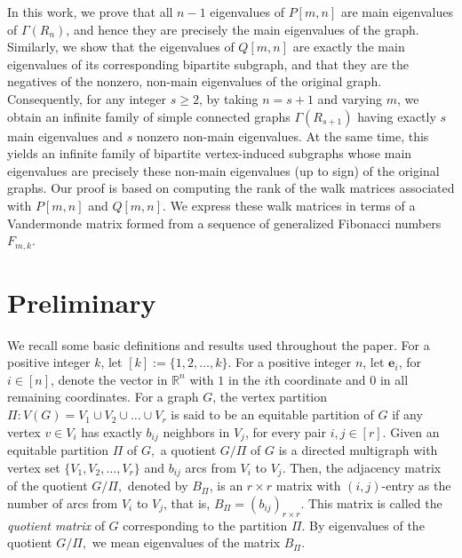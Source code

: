 \documentclass[11pt,oneside]{article}
\theoremstyle{plain}
\theoremstyle{plain}
\theoremstyle{definition}
\numberwithin{figure}{section}
\theoremstyle{remark}
\numberwithin{equation}{section}
\begin{document}
	In this work, we prove that all \(n-1\) eigenvalues of \(P[m,n]\) are main eigenvalues of \(\Gamma(R_n)\), and hence they are precisely the main eigenvalues of the graph. Similarly, we show that the eigenvalues of \(Q[m,n]\) are exactly the main eigenvalues of its corresponding bipartite subgraph, and that they are the negatives of the nonzero, non-main eigenvalues of the original graph. Consequently, for any integer \(s \ge 2\), by taking \(n = s+1\) and varying \(m\), we obtain an infinite family of simple connected graphs \(\Gamma(R_{s+1})\) having exactly \(s\) main eigenvalues and \(s\) nonzero non-main eigenvalues. At the same time, this yields an infinite family of bipartite vertex-induced subgraphs whose main eigenvalues are precisely these non-main eigenvalues (up to sign) of the original graphs.
	\newpage
	Our proof is based on computing the rank of the walk matrices associated with \( P[m,n] \) and \( Q[m,n] \). We express these walk matrices in terms of a Vandermonde matrix formed from a sequence of generalized Fibonacci numbers \( F_{m,k} \). 
	
	\section{Preliminary}
	
	\noindent
	We recall some basic definitions and results used throughout the paper. 
	For a positive integer $k$, let $[k] := \{1,2,\dots,k\}$. For a positive integer $n$, let $\mathbf{e}_i$, for $i \in [n]$, denote the vector in $\mathbb{R}^n$ with $1$ in the $i$th coordinate and $0$ in all remaining coordinates.
	For a graph $G$, the vertex partition $\Pi : V(G) = V_1 \cup V_2 \cup \dots \cup V_r$ is said to be an equitable partition of $G$ if any vertex $v \in V_i$ has exactly $b_{ij}$ neighbors in $V_j$, for every pair $i,j \in [r]$. Given an equitable partition $\Pi$ of $G,$ a quotient $G/\Pi$  of $G$ is a directed multigraph with vertex set $\{ V_1,V_2, \dots, V_r \}$ and $b_{ij}$ arcs from $V_i$ to $V_j.$ Then, the adjacency matrix of the quotient $G/\Pi,$ denoted by $B_{\Pi}$, is an $r \times r$ matrix with  $(i, j)$-entry as the number of arcs from $V_i$ to $V_j$, that is,  $B_{\Pi} = (b_{ij})_{r\times r}.$  This matrix is called the \textit{quotient matrix} of $G$ corresponding to the partition $\Pi.$ By eigenvalues of the quotient $G/\Pi,$ we mean eigenvalues of the matrix $B_{\Pi}.$ 
	
\end{document}
